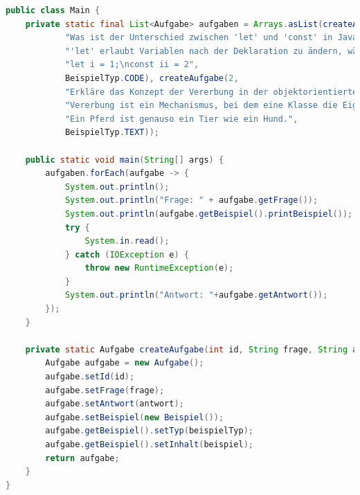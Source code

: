 \documentclass[./einleitung.tex]{subfiles}
\begin{document}
    \begin{lstlisting}[language=Java, caption=Main.java, label=lst:mainJava]
public class Main {
    private static final List<Aufgabe> aufgaben = Arrays.asList(createAufgabe(1,
            "Was ist der Unterschied zwischen 'let' und 'const' in JavaScript?",
            "'let' erlaubt Variablen nach der Deklaration zu ändern, während 'const' nur eine einmalige Zuweisung erlaubt. Der Wert einer 'const' Variable kann nicht geändert werden, aber die Eigenschaften eines Objekts oder Arrays, das mit 'const' deklariert wurde, können geändert werden.",
            "let i = 1;\nconst ii = 2",
            BeispielTyp.CODE), createAufgabe(2,
            "Erkläre das Konzept der Vererbung in der objektorientierten Programmierung.",
            "Vererbung ist ein Mechanismus, bei dem eine Klasse die Eigenschaften und Methoden einer anderen Klasse erben kann. Die Klasse, die erbt, wird als abgeleitete Klasse oder Unterklasse bezeichnet, während die Klasse, von der geerbt wird, als Basisklasse oder Oberklasse bezeichnet wird. Durch Vererbung können gemeinsame Eigenschaften und Verhalten wiederverwendet werden.",
            "Ein Pferd ist genauso ein Tier wie ein Hund.",
            BeispielTyp.TEXT));

    public static void main(String[] args) {
        aufgaben.forEach(aufgabe -> {
            System.out.println();
            System.out.println("Frage: " + aufgabe.getFrage());
            System.out.println(aufgabe.getBeispiel().printBeispiel());
            try {
                System.in.read();
            } catch (IOException e) {
                throw new RuntimeException(e);
            }
            System.out.println("Antwort: "+aufgabe.getAntwort());
        });
    }

    private static Aufgabe createAufgabe(int id, String frage, String antwort, String beispiel, BeispielTyp beispielTyp) {
        Aufgabe aufgabe = new Aufgabe();
        aufgabe.setId(id);
        aufgabe.setFrage(frage);
        aufgabe.setAntwort(antwort);
        aufgabe.setBeispiel(new Beispiel());
        aufgabe.getBeispiel().setTyp(beispielTyp);
        aufgabe.getBeispiel().setInhalt(beispiel);
        return aufgabe;
    }
}
    \end{lstlisting}
\end{document}
